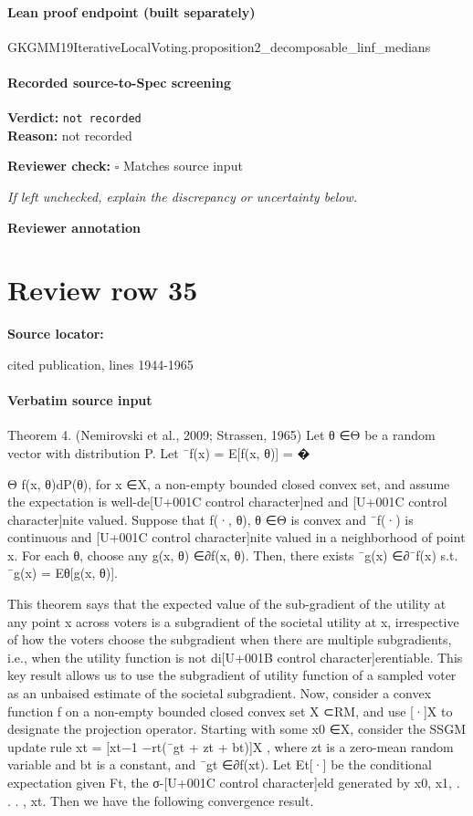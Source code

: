 \documentclass[10pt]{article}
\newcommand{\reviewerbox}{%
  \par\noindent\fbox{\parbox{0.96\linewidth}{\rule{0pt}{0.38in}}}\par
}
\newcommand{\reviewmatch}[1]{%
  \par\noindent\textbf{Reviewer check:} $\square$\; #1\par
  \noindent\emph{If left unchecked, explain the discrepancy or uncertainty below.}\par
}
\begin{document}
\paragraph{Lean proof endpoint (built separately)}\begin{ReviewVerbatim}
GKGMM19IterativeLocalVoting.proposition2_decomposable_linf_medians
\end{ReviewVerbatim}

\paragraph{Recorded source-to-Spec screening}
\textbf{Verdict:} \texttt{not recorded}
\\
\textbf{Reason:} not recorded
\reviewmatch{Matches source input}
\noindent\textbf{Reviewer annotation}\par
\reviewerbox
\clearpage
\hypertarget{source-claim-4f41e995c4d500c9}{}
\section*{Review row 35}
\textbf{Source locator:} {\footnotesize\raggedright cited publication, lines 1944-\allowbreak{}1965\par}
\paragraph{Verbatim source input}
\begin{ReviewVerbatim}
Theorem 4. (Nemirovski et al., 2009; Strassen, 1965) Let θ ∈Θ be a random vector with
distribution P. Let ¯f(x) = E[f(x, θ)] =
�

Θ f(x, θ)dP(θ), for x ∈X, a non-empty bounded
closed convex set, and assume the expectation is well-de[U+001C control character]ned and [U+001C control character]nite valued. Suppose that
f(·, θ), θ ∈Θ is convex and ¯f(·) is continuous and [U+001C control character]nite valued in a neighborhood of point
x.
For each θ, choose any g(x, θ) ∈∂f(x, θ). Then, there exists ¯g(x) ∈∂¯f(x) s.t. ¯g(x) =
Eθ[g(x, θ)].

This theorem says that the expected value of the sub-gradient of the utility at any point
x across voters is a subgradient of the societal utility at x, irrespective of how the voters
choose the subgradient when there are multiple subgradients, i.e., when the utility function
is not di[U+001B control character]erentiable. This key result allows us to use the subgradient of utility function of a
sampled voter as an unbaised estimate of the societal subgradient.
Now, consider a convex function f on a non-empty bounded closed convex set X ⊂RM,
and use [·]X to designate the projection operator. Starting with some x0 ∈X, consider the
SSGM update rule xt = [xt−1 −rt(¯gt + zt + bt)]X , where zt is a zero-mean random variable
and bt is a constant, and ¯gt ∈∂f(xt). Let Et[·] be the conditional expectation given Ft, the
σ-[U+001C control character]eld generated by x0, x1, . . . , xt. Then we have the following convergence result.
\end{ReviewVerbatim}
\end{document}

